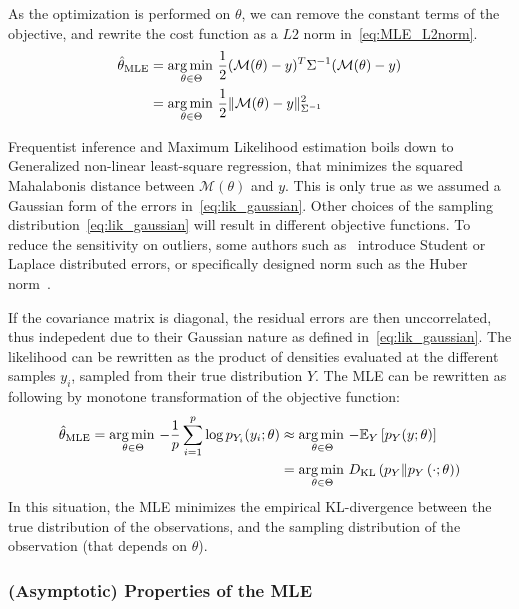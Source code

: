 \documentclass[../../Main_ManuscritThese.tex]{subfiles}
\begin{document}
As the optimization is performed on $\theta$, we can remove the constant terms of the objective, and rewrite the cost function as a $L2$ norm in~\cref{eq:MLE_L2norm}.  %
  \begin{align}
    \hat{\theta}_{\mathrm{MLE}} &= \operatorname*{arg\,min \,}_{\theta \in \Theta}\frac{1}{2}(\mathcal{M}(\theta) - y)^T\Sigma^{-1}(\mathcal{M}(\theta) - y) \nonumber\\
                           &= \operatorname*{arg\,min \,}_{\theta \in \Theta}\frac12 \| \mathcal{M}(\theta) - y \|^2_{\Sigma^{-1}} \label{eq:MLE_L2norm}
  \end{align}

  Frequentist inference and Maximum Likelihood estimation boils down to Generalized non-linear least-square regression, that minimizes the squared Mahalabonis distance between $\mathcal{M}({\theta})$ and $y$. This is only true as we assumed a Gaussian form of the errors in~\cref{eq:lik_gaussian}. Other choices of the sampling distribution~\cref{eq:lik_gaussian} will result in different objective functions. To reduce the sensitivity on outliers, some authors such as~\cite{rao_robust_2015} introduce Student or Laplace distributed errors, or specifically designed norm such as the Huber norm~\cite{huber_robust_2011}.

  If the covariance matrix is diagonal, the residual errors are then unccorrelated, thus indepedent due to their Gaussian nature as defined in~\cref{eq:lik_gaussian}. The likelihood can be rewritten as the product of densities evaluated at the different samples $y_i$, sampled from their true distribution $Y$. The MLE can be rewritten as following by monotone transformation of the objective function:
\begin{align}
  \hat{\theta}_{\mathrm{MLE}} = \operatorname*{arg\,min \,}_{\theta \in \Theta} -\frac{1}{p} \sum_{i=1}^p\log p_{Y_i}(y_i;\theta) &\approx \operatorname*{arg\,min \,}_{\theta \in \Theta} -\mathbb{E}_{Y}\left[p_{Y}(y ; \theta)\right]  \\
                                                                                                                         &= \operatorname*{arg\,min \,}_{\theta \in\Theta} D_{\mathrm{KL}}\left(p_Y \| p_Y\left(\cdot;\theta \right)\right)
\end{align}
In this situation, the MLE minimizes the empirical KL-divergence between the true distribution of the observations, and the sampling distribution of the observation (that depends on $\theta$).

\subsubsection{(Asymptotic) Properties of the MLE}
\end{document}
